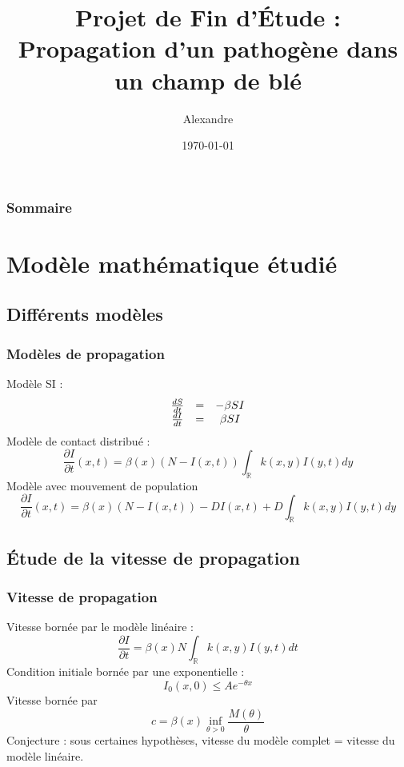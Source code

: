 \documentclass[handout]{beamer}
\title[PFE]{Projet de Fin d'Étude : \\ Propagation d'un pathogène dans un champ de blé}
\author{Alexandre \bsc{Vieira}}
\institute{INSA de Rouen}
\date{\today}
\newcommand{\derPar}[2]{\frac{\partial #1}{\partial #2}}
\begin{document}
\begin{frame}
\titlepage
\end{frame}

\begin{frame}
	\frametitle{Sommaire}
	\tableofcontents
\end{frame}

\section[Modèle]{Modèle mathématique étudié}
\subsection[Diff. modèles]{Différents modèles}
\begin{frame}
	\frametitle{Modèles de propagation}
Modèle SI :
\[\begin{array}{c c c}
	\frac{dS}{dt}&=&-\beta SI\\
	\frac{dI}{dt}&=&\beta SI
\end{array}\]
Modèle de contact distribué :
\begin{equation} \label{eqKot}
	\derPar{I}{t}(x,t)=\beta(x)(N-I(x,t))\int_{\mathbb{R}}k(x,y)I(y,t) dy
\end{equation}
Modèle avec mouvement de population
\begin{equation}
	\derPar{I}{t}(x,t)=\beta(x)(N-I(x,t))-DI(x,t)+D\int_{\mathbb{R}}k(x,y)I(y,t) dy
\end{equation}
\end{frame}

\subsection[Vitesse]{Étude de la vitesse de propagation}
\begin{frame}
	\frametitle{Vitesse de propagation}
Vitesse bornée par le modèle linéaire :
\[\derPar{I}{t}=\beta(x)N\int_{\mathbb{R}}k(x,y)I(y,t) dt\]
Condition initiale bornée par une exponentielle :
\[I_0(x,0)\leq Ae^{-\theta x}\]	
Vitesse bornée par
\begin{equation}\label{bornVit}
	c=\beta(x)\inf_{\theta>0}\frac{M(\theta)}{\theta}
\end{equation}
Conjecture : sous certaines hypothèses, vitesse du modèle complet = vitesse du modèle linéaire.
\end{frame}
\end{document}

